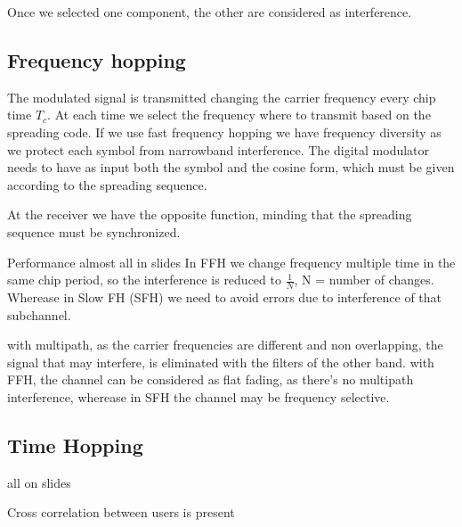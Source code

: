 Once we selected one component, the other are considered as interference.%

\subsection{Frequency hopping}
The modulated signal is transmitted changing the carrier frequency every chip time $T_c$. At each time we select the frequency where to transmit based on the spreading code. If we use fast frequency hopping we have frequency diversity as we protect each symbol from narrowband interference. The digital modulator needs to have as input both the symbol and the cosine form, which must be given according to the spreading sequence.

At the receiver we have the opposite function, minding that the spreading sequence must be synchronized.

Performance almost all in slides
In FFH we change frequency multiple time in the same chip period, so the interference is reduced to $\frac{1}{N}$, N = number of changes. Wherease in Slow FH (SFH) we need to avoid errors due to interference of that subchannel.

with multipath, as the carrier frequencies are different and non overlapping, the signal that may interfere, is eliminated with the filters of the other band.
with FFH, the channel can be considered as flat fading, as there's no multipath interference, wherease in SFH the channel may be frequency selective.

\subsection{Time Hopping}
all on slides

Cross correlation between users is present
